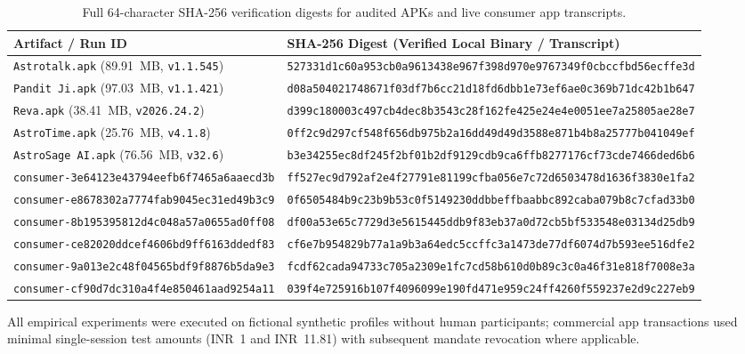 \begin{table}[t]
\centering
\caption{Full 64-character SHA-256 verification digests for audited APKs and live consumer app transcripts.}
\label{tab:hashes}
\scriptsize
\begin{tabularx}{\textwidth}{@{}L{6.25cm} Y@{}}
\toprule
\textbf{Artifact / Run ID} & \textbf{SHA-256 Digest (Verified Local Binary / Transcript)} \\
\midrule
\texttt{Astrotalk.apk} (89.91~MB, \texttt{v1.1.545}) & \texttt{527331d1c60a953cb0a9613438e967f398d970e9767349f0cbccfbd56ecffe3d} \\
\texttt{Pandit Ji.apk} (97.03~MB, \texttt{v1.1.421}) & \texttt{d08a504021748671f03df7b6cc21d18fd6dbb1e73ef6ae0c369b71dc42b1b647} \\
\texttt{Reva.apk} (38.41~MB, \texttt{v2026.24.2}) & \texttt{d399c180003c497cb4dec8b3543c28f162fe425e24e4e0051ee7a25805ae28e7} \\
\texttt{AstroTime.apk} (25.76~MB, \texttt{v4.1.8}) & \texttt{0ff2c9d297cf548f656db975b2a16dd49d49d3588e871b4b8a25777b041049ef} \\
\texttt{AstroSage AI.apk} (76.56~MB, \texttt{v32.6}) & \texttt{b3e34255ec8df245f2bf01b2df9129cdb9ca6ffb8277176cf73cde7466ded6b6} \\
\midrule
\texttt{consumer-3e64123e43794eefb6f7465a6aaecd3b} & \texttt{ff527ec9d792af2e4f27791e81199cfba056e7c72d6503478d1636f3830e1fa2} \\
\texttt{consumer-e8678302a7774fab9045ec31ed49b3c9} & \texttt{0f6505484b9c23b9b53c0f5149230ddbbeffbaabbc892caba079b8c7cfad33b0} \\
\texttt{consumer-8b195395812d4c048a57a0655ad0ff08} & \texttt{df00a53e65c7729d3e5615445ddb9f83eb37a0d72cb5bf533548e03134d25db9} \\
\texttt{consumer-ce82020ddcef4606bd9ff6163ddedf83} & \texttt{cf6e7b954829b77a1a9b3a64edc5ccffc3a1473de77df6074d7b593ee516dfe2} \\
\texttt{consumer-9a013e2c48f04565bdf9f8876b5da9e3} & \texttt{fcdf62cada94733c705a2309e1fc7cd58b610d0b89c3c0a46f31e818f7008e3a} \\
\texttt{consumer-cf90d7dc310a4f4e850461aad9254a11} & \texttt{039f4e725916b107f4096099e190fd471e959c24ff4260f559237e2d9c227eb9} \\
\bottomrule
\end{tabularx}
\end{table}

All empirical experiments were executed on fictional synthetic profiles without human participants; commercial app transactions used minimal single-session test amounts (INR~1 and INR~11.81) with subsequent mandate revocation where applicable.
